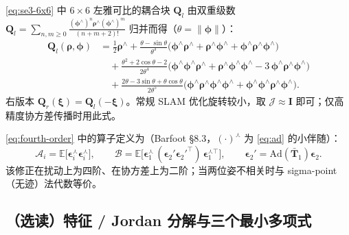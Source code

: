 \begin{derivation}\label{deriv:Ql}
\cref{eq:se3-6x6} 中 $6\times6$ 左雅可比的耦合块 $\mathbf{Q}_l$ 由双重级数 $\mathbf{Q}_l=\sum_{n,m\ge0}\frac{(\boldsymbol{\phi}^\wedge)^n\boldsymbol{\rho}^\wedge(\boldsymbol{\phi}^\wedge)^m}{(n+m+2)!}$ 归并而得（$\theta=\|\boldsymbol{\phi}\|$）：
\begin{align*}
  \mathbf{Q}_l(\boldsymbol{\rho},\boldsymbol{\phi})
  &=\tfrac12\boldsymbol{\rho}^\wedge
   +\frac{\theta-\sin\theta}{\theta^3}\big(\boldsymbol{\phi}^\wedge\boldsymbol{\rho}^\wedge+\boldsymbol{\rho}^\wedge\boldsymbol{\phi}^\wedge+\boldsymbol{\phi}^\wedge\boldsymbol{\rho}^\wedge\boldsymbol{\phi}^\wedge\big)\\
  &\quad+\frac{\theta^2+2\cos\theta-2}{2\theta^4}\big(\boldsymbol{\phi}^\wedge\boldsymbol{\phi}^\wedge\boldsymbol{\rho}^\wedge+\boldsymbol{\rho}^\wedge\boldsymbol{\phi}^\wedge\boldsymbol{\phi}^\wedge-3\,\boldsymbol{\phi}^\wedge\boldsymbol{\rho}^\wedge\boldsymbol{\phi}^\wedge\big)\\
  &\quad+\frac{2\theta-3\sin\theta+\theta\cos\theta}{2\theta^5}\big(\boldsymbol{\phi}^\wedge\boldsymbol{\rho}^\wedge\boldsymbol{\phi}^\wedge\boldsymbol{\phi}^\wedge+\boldsymbol{\phi}^\wedge\boldsymbol{\phi}^\wedge\boldsymbol{\rho}^\wedge\boldsymbol{\phi}^\wedge\big).
\end{align*}
右版本 $\mathbf{Q}_r(\boldsymbol{\xi})=\mathbf{Q}_l(-\boldsymbol{\xi})$。常规 SLAM 优化旋转较小，取 $\boldsymbol{\mathcal{J}}\approx\mathbf{I}$ 即可；仅高精度协方差传播时用此式。
\end{derivation}

\begin{derivation}
\cref{eq:fourth-order} 中的算子定义为（Barfoot\cite{barfoot2024state} §8.3，$(\cdot)^\curlywedge$ 为 \cref{eq:ad} 的小伴随）：
\[
  \boldsymbol{\mathcal{A}}_i=\mathbb{E}\!\big[\boldsymbol{\epsilon}_i^\curlywedge\boldsymbol{\epsilon}_i^\curlywedge\big],\qquad
  \boldsymbol{\mathcal{B}}=\mathbb{E}\!\big[\boldsymbol{\epsilon}_1^\curlywedge\,(\boldsymbol{\epsilon}_2'\boldsymbol{\epsilon}_2'^\top)\,\boldsymbol{\epsilon}_1^{\curlywedge\top}\big],\qquad
  \boldsymbol{\epsilon}_2'=\mathrm{Ad}(\bar{\mathbf{T}}_1)\boldsymbol{\epsilon}_2.
\]
该修正在扰动上为四阶、在协方差上为二阶；当两位姿不相关时与 sigma-point（无迹）法代数等价。
\end{derivation}

\subsection{（选读）特征 / Jordan 分解与三个最小多项式}
\label{subsec:minimal-poly}

